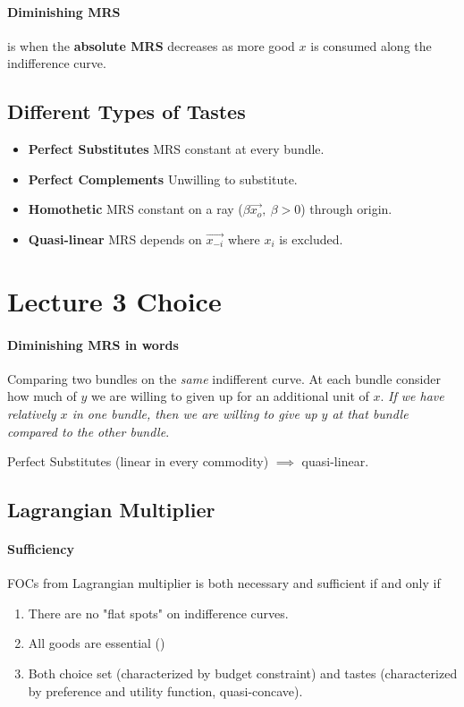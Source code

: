 \documentclass[]{article}
\begin{document}
            \paragraph{Diminishing MRS} is when the \textbf{absolute MRS} decreases as more good $x$ is consumed along the indifference curve.
            
        \subsection{Different Types of Tastes}
            \begin{itemize}
                \item \textbf{Perfect Substitutes} MRS constant at every bundle.
                \item \textbf{Perfect Complements} Unwilling to substitute.
                \item \textbf{Homothetic} MRS constant on a ray ($\beta \vec{x_o},\ \beta > 0$) through origin.
                \item \textbf{Quasi-linear} MRS depends on $\vec{x_{-i}}$ where $x_i$ is excluded.
            \end{itemize}
            
    \section{Lecture 3 Choice}
        \paragraph{Diminishing MRS in words} Comparing two bundles on the \emph{same} indifferent curve. At each bundle consider how much of $y$ we are willing to given up for an additional unit of $x$. \emph{If we have relatively  $x$ in one bundle, then we are  willing to give up $y$ at that bundle compared to the other bundle}.
        
        \begin{remark}
            Perfect Substitutes (linear in every commodity) $\implies$ quasi-linear.
        \end{remark}
        
        \subsection{Lagrangian Multiplier}
            \paragraph{Sufficiency} FOCs from Lagrangian multiplier is both necessary and sufficient if and only if
                \begin{enumerate}
                    \item There are no "flat spots" on indifference curves.
                    \item All goods are essential ()
                    \item Both choice set (characterized by budget constraint) and tastes (characterized by preference and utility function, quasi-concave).
                \end{enumerate}
\end{document}
